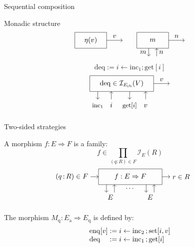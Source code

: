 \documentclass[aspectratio=54]{beamer}
\newcommand{\kw}[1]{\ensuremath{ \mathrm{#1} }}
\newcommand{\deqpic}[3]{%
  \begin{tikzpicture}[scale=0.4]
    \draw (-4,-1) rectangle (4,1);
    \node (x) at (0,0) {$#1$};
    \draw[->] (-3, -1) -- (-3, -2);
    \node[anchor=base] at (-3, -3) {\small $\kw{inc}_1$};
    \draw[<-] (-1.3, -1) -- (-1.3, -2);
    \node[anchor=base] at (-1.3, -3) {$#2$};
    \draw[->] (1, -1) -- (1, -2);
    \node[anchor=base] at (1, -3) {\small $\kw{get}[#2]$};
    \draw[<-] (3, -1) -- (3, -2);
    \node[anchor=base] at (3, -3) {$#3$};
    \draw[->] (4,0) -- node[above] {$#3$} (6,0);
  \end{tikzpicture}%
}
\begin{document}
\begin{frame}[fragile]{Sequential composition}
\begin{block}{Monadic structure}
\[    %
    \begin{tikzpicture}[scale=0.4,baseline=0]
      \draw (-2,-1) rectangle (2,1);
      \draw[->] (2,0) -- node[above] {$v$} (4,0);
      \node (L) at (0,0) {$\eta(v)$};
    \end{tikzpicture}
    \qquad
    \begin{tikzpicture}[scale=0.4,baseline=0]
      \draw (-2,-1) rectangle (2,1);
      \draw[->] (2,0) -- node[above] {$n$} (4,0);
      \node (L) at (0,0) {$m$};
      \draw[->] (-0.5, -1) -- node[left]  {$m$} (-0.5, -2);
      \draw[->] ( 0.5, -2) -- node[right] {$n$} ( 0.5, -1);
    \end{tikzpicture}
  \]
\end{block}

\begin{example}
  \[
    \kw{deq} :=
      i \leftarrow \kw{inc}_1 \mathrel{;} \kw{get}[i]
  \]
  \[
    \deqpic{\kw{deq} \in \mathcal{I}_{E_\kw{rb}}(V)}{i}{v}
  \]
\end{example}
\end{frame}

\begin{frame}{Two-sided strategies} %
  \begin{definition}
    A morphism $f : E \Rightarrow F$ is a family:
    \[
      f \in \prod_{(q : R) \in F} \mathcal{I}_E(R)
    \]
    \[
      \begin{tikzpicture}[scale=0.4]
        \draw[->] (-5,0) node[left] {$(q \mathop{:} R) \in F$} -- (-4,0);
        \draw (-4,-1) rectangle (4,1);
        \draw[->] (4,0) -- (5,0) node[right] {$r \in R$};
        \node (f) at (0,0) {$f : E \Rightarrow F$};
        \draw[->] (-3, -1) -- (-3, -2);
        \draw[->] (-2, -2) -- (-2, -1);
        \node[below] at (0, -1) {$\cdots$};
        \draw[->] (2, -1) -- (2, -2);
        \draw[->] (3, -2) -- (3, -1);
        \node[below] at (-2.5, -2) {$E$};
        \node[below] at ( 2.5, -2) {$E$};
      \end{tikzpicture}
      \qquad
    \]
  \end{definition}
  \pause
  \begin{example}
    The morphism $M_\kw{q} : E_\kw{a} \Rightarrow E_\kw{q}$ is defined by:
    \[
      \begin{array}{l@{}l}
        \kw{enq}[v] & {} :=
          i \leftarrow \kw{inc}_2 \mathop{;} \kw{set}[i, v] \\
        \kw{deq} & {} :=
          i \leftarrow \kw{inc}_1 \mathop{;} \kw{get}[i]
      \end{array}
    \]
  \end{example}
\end{frame}
\end{document}
